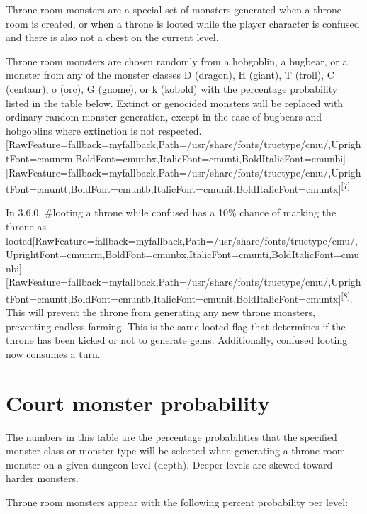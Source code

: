 Throne room monsters are a special set of monsters generated when a throne room is created, or when a throne is looted while the player character is confused and there is also not a chest on the current level.


Throne room monsters are chosen randomly from a hobgoblin, a bugbear, or a monster from any of the monster classes D (dragon), H (giant), T (troll), C (centaur), o (orc), G (gnome), or k (kobold) with the percentage probability listed in the table below. Extinct or genocided monsters will be replaced with ordinary random monster generation, except in the case of bugbears and hobgoblins where extinction is not respected.\allowbreak{}\setmainfont{cmunrm.ttf}[RawFeature={fallback=myfallback},Path=/usr/share/fonts/truetype/cmu/,UprightFont=cmunrm,BoldFont=cmunbx,ItalicFont=cmunti,BoldItalicFont=cmunbi]\setmonofont{cmunrm.ttf}[RawFeature={fallback=myfallback},Path=/usr/share/fonts/truetype/cmu/,UprightFont=cmuntt,BoldFont=cmuntb,ItalicFont=cmunit,BoldItalicFont=cmuntx]\textsuperscript{{$\text{[}$}7{$\text{]}$}}


In 3.6.0, \#looting a throne while confused has a 10\% chance of marking the throne as looted\allowbreak{}\setmainfont{cmunrm.ttf}[RawFeature={fallback=myfallback},Path=/usr/share/fonts/truetype/cmu/,UprightFont=cmunrm,BoldFont=cmunbx,ItalicFont=cmunti,BoldItalicFont=cmunbi]\setmonofont{cmunrm.ttf}[RawFeature={fallback=myfallback},Path=/usr/share/fonts/truetype/cmu/,UprightFont=cmuntt,BoldFont=cmuntb,ItalicFont=cmunit,BoldItalicFont=cmuntx]\textsuperscript{{$\text{[}$}8{$\text{]}$}}. This will prevent the throne from generating any new throne monsters, preventing endless farming. This is the same looted flag that determines if the throne has been kicked or not to generate gems. Additionally, confused looting now consumes a turn.



\section{Court monster probability}
\label{6}
The numbers in this table are the percentage probabilities that the specified monster class or monster type will be selected when generating a throne room monster on a given dungeon level (depth). Deeper levels are skewed toward harder monsters.


Throne room monsters appear with the following percent probability per level:




